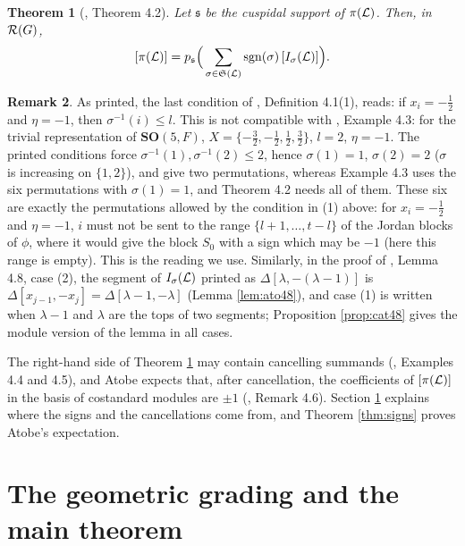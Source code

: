 \documentclass[a4paper,12pt,leqno]{amsart}
\theoremstyle{plain}
\newtheorem{thm}{Theorem}[section]
\theoremstyle{definition}
\newtheorem{rmk}[thm]{Remark}
\providecommand{\frS}{\mathfrak{S}}\providecommand{\frs}{\mathfrak{s}}
\begin{document}
\begin{thm}[\cite{Ato24}, Theorem 4.2]\label{thm:atobe} Let $\frs$ be the cuspidal support of
$\pi(\mathcal{L})$. Then, in $\mathcal{R}(G)$,
\[[\pi(\caL)]=p_\frs\Big(\sum_{\sigma\in\frS(\caL)}\mathrm{sgn}(\sigma)\,[I_\sigma(\caL)]\Big).\]
\end{thm}

\begin{rmk}\label{rmk:typo} As printed, the last condition of \cite{Ato24}, Definition 4.1(1), reads:
if $x_i=-\tfrac12$ and $\eta=-1$, then $\sigma^{-1}(i)\leq l$. This is not compatible with
\cite{Ato24}, Example 4.3: for the trivial representation of $\mathbf{SO}(5,F)$, $X=\{-\tfrac32,
-\tfrac12,\tfrac12,\tfrac32\}$, $l=2$, $\eta=-1$. The printed conditions force $\sigma^{-1}(1),
\sigma^{-1}(2)\leq2$, hence $\sigma(1)=1$, $\sigma(2)=2$ ($\sigma$ is increasing on $\{1,2\}$), and give
two permutations, whereas Example 4.3 uses the six permutations with $\sigma(1)=1$, and Theorem 4.2
needs all of them. These six are exactly the permutations allowed by the condition in (1) above:
for $x_i=-\tfrac12$ and $\eta=-1$, $i$ must not be sent to the range $\{l+1,\ldots,t-l\}$ of the
Jordan blocks of $\phi$, where it would give the block $S_0$ with a sign which may be $-1$ (here this
range is empty). This is the reading we use. Similarly, in the proof of \cite{Ato24}, Lemma 4.8, case
(2), the segment of $I_\sigma(\mathcal{L})$ printed as $\Delta[\lambda,-(\lambda-1)]$ is
$\Delta[x_{j-1},-x_j]=\Delta[\lambda-1,-\lambda]$ (Lemma \ref{lem:ato48}), and case (1) is written when
$\lambda-1$ and $\lambda$ are the tops of two segments; Proposition \ref{prop:cat48} gives the module version
of the lemma in all cases.
\end{rmk}

\noindent The right-hand side of Theorem \ref{thm:atobe} may contain cancelling summands
(\cite{Ato24}, Examples 4.4 and 4.5), and Atobe expects that, after cancellation, the coefficients of
$[\pi(\mathcal{L})]$ in the basis of costandard modules are $\pm1$ (\cite{Ato24}, Remark 4.6). Section
\ref{sec:conj} explains where the signs and the cancellations come from, and Theorem \ref{thm:signs}
proves Atobe's expectation.

\section{The geometric grading and the main theorem}\label{sec:conj}
\end{document}
